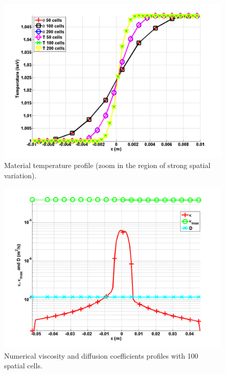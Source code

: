 \documentclass[review]{elsarticle}
\begin{document}
\begin{figure}[H]
        \centering
        \includegraphics[width=\textwidth]{Mach_1p05_zoom_in_temperatures.png}
        \caption{Material temperature profile (zoom in the region of strong spatial variation).}
        \label{fig:Mach_1p05_frozen_temp}
\end{figure}        
\begin{figure}[H]
        \centering
        \includegraphics[width=\textwidth]{Mach_1p05_frozen_in_viscosity_coeffs.png}
        \caption{Numerical viscosity and diffusion coefficients profiles with 100 spatial cells.}
        \label{fig:Mach_1p05_frozen_visc}
\end{figure}
\end{document}
